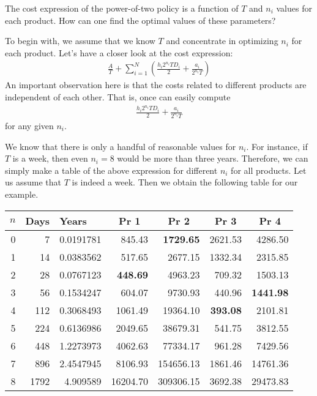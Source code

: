 \begin{exercise}
The cost expression of the power-of-two policy is a function of $T$ and $n_i$ values for each product. How can one find the optimal values of these parameters?


\begin{solution}
To begin with, we assume that we know $T$ and concentrate in optimizing $n_i$ for each product. Let's have a closer look at the cost expression:
\begin{align*}
\frac{A}{T} + \sum_{i=1}^N \left(\frac{h_i 2^{n_i} T D_i}{2} + \frac{a_i}{2^{n_i} T}\right)
\end{align*}
An important observation here is that the costs related to different products are independent of each other. That is, once can easily compute 
\begin{align*}
\frac{h_i 2^{n_i} T D_i}{2} + \frac{a_i}{2^{n_i} T}
\end{align*}
for any given $n_i$. 

We know that there is only a handful of reasonable values for $n_i$. For instance, if $T$ is a week, then even $n_i=8$ would be more than three years. Therefore, we can simply make a table of the above expression for different $n_i$ for all products. Let us assume that $T$ is indeed a week. Then we obtain the following table for our example. 

\begin{center}
    \begin{tabular}{rrr|rrrr}
    \multicolumn{1}{c}{$n$} & \multicolumn{1}{c}{Days} & \multicolumn{1}{l}{Years} & \multicolumn{1}{c}{Pr 1} & \multicolumn{1}{c}{Pr 2} & \multicolumn{1}{c}{Pr 3} & \multicolumn{1}{c}{Pr 4} \\
    \toprule
    0     & 7     & 0.0191781 & 845.43 & \textbf{1729.65} & 2621.53 & 4286.50 \\
    1     & 14    & 0.0383562 & 517.65 & 2677.15 & 1332.34 & 2315.85 \\
    2     & 28    & 0.0767123 & \textbf{448.69} & 4963.23 & 709.32 & 1503.13 \\
    3     & 56    & 0.1534247 & 604.07 & 9730.93 & 440.96 & \textbf{1441.98} \\
    4     & 112   & 0.3068493 & 1061.49 & 19364.10 & \textbf{393.08} & 2101.81 \\
    5     & 224   & 0.6136986 & 2049.65 & 38679.31 & 541.75 & 3812.55 \\
    6     & 448   & 1.2273973 & 4062.63 & 77334.17 & 961.28 & 7429.56 \\
    7     & 896   & 2.4547945 & 8106.93 & 154656.13 & 1861.46 & 14761.36 \\
    8     & 1792  & 4.909589 & 16204.70 & 309306.15 & 3692.38 & 29473.83 \\
    \bottomrule
    \end{tabular}
\end{center}


\end{solution}
\end{exercise}
